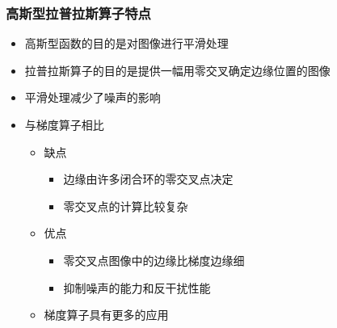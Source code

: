 \documentclass{beamer}
\begin{document}
\begin{frame}
\frametitle{高斯型拉普拉斯算子特点}
\label{sec-2-15}

\begin{itemize}
\item 高斯型函数的目的是对图像进行平滑处理
\item 拉普拉斯算子的目的是提供一幅用零交叉确定边缘位置的图像
\item 平滑处理减少了噪声的影响
\item 与梯度算子相比
\begin{itemize}
\item 缺点
\begin{itemize}
\item 边缘由许多闭合环的零交叉点决定
\item 零交叉点的计算比较复杂
\end{itemize}
\item 优点
\begin{itemize}
\item 零交叉点图像中的边缘比梯度边缘细
\item 抑制噪声的能力和反干扰性能
\end{itemize}
\item 梯度算子具有更多的应用
\end{itemize}
\end{itemize}
\end{frame}
\end{document}
